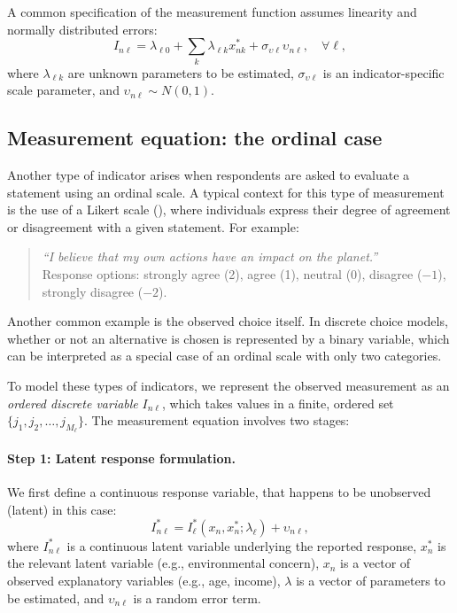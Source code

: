 \documentclass[12pt,a4paper]{article}
\begin{document}
A common specification of the measurement function assumes linearity
and normally distributed errors:
\begin{equation}
\label{eq:linearMeasurement}
I_{n\ell} = \lambda_{\ell 0} + \sum_k \lambda_{\ell k}  x_{nk}^* + \sigma_{\upsilon \ell} \upsilon_{n\ell}, \quad \forall \ell,
\end{equation}
where $\lambda_{\ell k}$ are unknown parameters to be estimated, $\sigma_{\upsilon \ell}$ is an indicator-specific scale parameter, and $\upsilon_{n\ell} \sim N(0, 1)$.


\subsection{Measurement equation: the ordinal case}

Another type of indicator arises when respondents are asked to
evaluate a statement using an ordinal scale. A typical context for
this type of measurement is the use of a Likert scale
(\cite{likert1932technique}), where individuals express their degree of
agreement or disagreement with a given statement. For example:
\begin{quote}
\emph{``I believe that my own actions have an impact on the planet.''} \\
Response options: strongly agree (2), agree (1), neutral (0), disagree ($-1$), strongly disagree ($-2$).
\end{quote}

Another common example is the observed choice itself. In discrete
choice models, whether or not an alternative is chosen is represented
by a binary variable, which can be interpreted as a special case of an
ordinal scale with only two categories.

To model these types of indicators, we represent the observed
measurement as an \emph{ordered discrete variable} $I_{n\ell}$, which
takes values in a finite, ordered set $\{j_1, j_2, \ldots, j_{M_\ell}\}$. The
measurement equation involves two stages:

\paragraph{Step 1: Latent response formulation.} We first define a continuous response variable, that happens to be unobserved (latent) in this case:
\begin{equation}
I^*_{n\ell} = I^*_\ell(x_n, x_n^*; \lambda_\ell) + \upsilon_{n\ell},
\end{equation}
where $I^*_{n\ell}$ is a continuous latent variable underlying the
reported response, $x_n^*$ is the relevant latent variable (e.g.,
environmental concern), $x_n$ is a vector of observed explanatory
variables (e.g., age, income), $\lambda$ is a vector of parameters to
be estimated, and $\upsilon_{n\ell}$ is a random error term.
\end{document}
